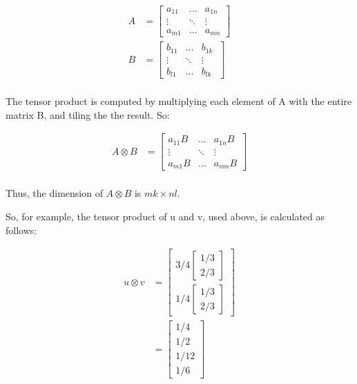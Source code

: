 \documentclass[11pt]{article}
\begin{document}
\begin {align}
A &= \begin{bmatrix}
	a_{11} & \dots & a_{1n} \   \\ 
	\vdots & \ddots & \vdots \\ 
	a_{m1} & \dots & a_{mn}
\end{bmatrix} \\ 
B &= \begin{bmatrix}
	b_{11} & \dots & b_{1k} \   \\ 
	\vdots & \ddots & \vdots \\ 
	b_{l1} & \dots & b_{lk}
\end{bmatrix} \\ 
\end{align}	

The tensor product is computed by multiplying each element of A with the entire matrix B, and tiling the the result. So:

\begin {align}
A \otimes B &= \begin{bmatrix}
	a_{11} B & \dots & a_{1n} B \   \\ 
	\vdots & \ddots & \vdots \\ 
	a_{m1} B & \dots & a_{mn} B
\end{bmatrix} \\ 
\end{align}

Thus, the dimension of $A \otimes B$ is $mk \times nl$.

So, for example, the tensor product of u and v, used above, is calculated as follows:

\begin {align}
u \otimes v &= \begin{bmatrix}
	3/4 \begin{bmatrix} 1/3 \\ 2/3 \end{bmatrix} \\ 
	1/4 \begin{bmatrix} 1/3 \\ 2/3 \end{bmatrix} 
\end{bmatrix}  \\
	&= 	\begin{bmatrix}
		1/4 \\ 
		1/2 \\
		1/12 \\
		1/6
	\end{bmatrix}
\end{align}
\end{document}
